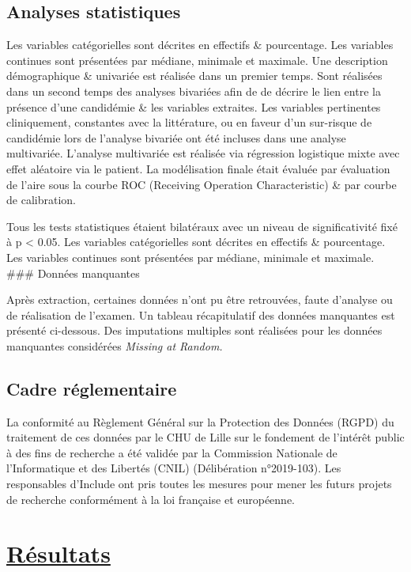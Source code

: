 \documentclass[
  french,
  letterpaper,
  DIV=11,
  numbers=noendperiod,
  justified]{scrartcl}
\begin{document}
\subsection{Analyses statistiques}\label{analyses-statistiques}

Les variables catégorielles sont décrites en effectifs \& pourcentage.
Les variables continues sont présentées par médiane, minimale et
maximale. Une description démographique \& univariée est réalisée dans
un premier temps. Sont réalisées dans un second temps des analyses
bivariées afin de de décrire le lien entre la présence d'une candidémie
\& les variables extraites. Les variables pertinentes cliniquement,
constantes avec la littérature, ou en faveur d'un sur-risque de
candidémie lors de l'analyse bivariée ont été incluses dans une analyse
multivariée. L'analyse multivariée est réalisée via régression
logistique mixte avec effet aléatoire via le patient. La modélisation
finale était évaluée par évaluation de l'aire sous la courbe ROC
(Receiving Operation Characteristic) \& par courbe de calibration.

Tous les tests statistiques étaient bilatéraux avec un niveau de
significativité fixé à p \textless{} 0.05. Les variables catégorielles
sont décrites en effectifs \& pourcentage. Les variables continues sont
présentées par médiane, minimale et maximale. \#\#\# Données manquantes

Après extraction, certaines données n'ont pu être retrouvées, faute
d'analyse ou de réalisation de l'examen. Un tableau récapitulatif des
données manquantes est présenté ci-dessous. Des imputations multiples
sont réalisées pour les données manquantes considérées \emph{Missing at
Random.}

\subsection{Cadre réglementaire}\label{cadre-ruxe9glementaire}

La conformité au Règlement Général sur la Protection des Données (RGPD)
du traitement de ces données par le CHU de Lille sur le fondement de
l'intérêt public à des fins de recherche a été validée par la Commission
Nationale de l'Informatique et des Libertés (CNIL) (Délibération
n°2019-103). Les responsables d'Include ont pris toutes les mesures pour
mener les futurs projets de recherche conformément à la loi française et
européenne.

\section{\texorpdfstring{\ul{Résultats}}{Résultats}}\label{ruxe9sultats}
\end{document}

